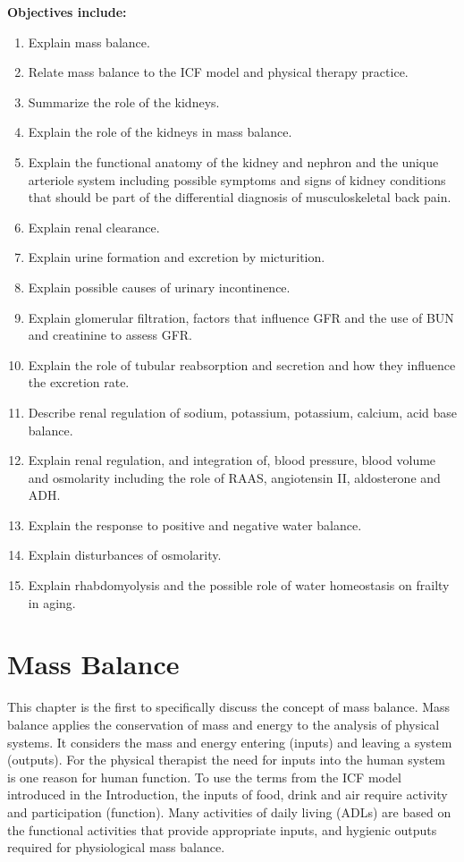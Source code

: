 \textbf{Objectives include:}
\begin{enumerate}
    \item Explain mass balance.
    \item Relate mass balance to the ICF model and physical therapy practice. 
    \item Summarize the role of the kidneys.
    \item Explain the role of the kidneys in mass balance.
    \item Explain the functional anatomy of the kidney and nephron and the unique arteriole system including possible symptoms and signs of kidney conditions that should be part of the differential diagnosis of musculoskeletal back pain.
    \item Explain renal clearance.
    \item Explain urine formation and excretion by micturition.
    \item Explain possible causes of urinary incontinence.
    \item Explain glomerular filtration, factors that influence GFR and the use of BUN and creatinine to assess GFR.
    \item Explain the role of tubular reabsorption and secretion and how they influence the excretion rate.
    \item Describe renal regulation of sodium, potassium, potassium, calcium, acid base balance.
    \item Explain renal regulation, and integration of, blood pressure, blood volume and osmolarity including the role of RAAS, angiotensin II, aldosterone and ADH.
    \item Explain the response to positive and negative water balance.
    \item Explain disturbances of osmolarity.
    \item Explain rhabdomyolysis and the possible role of water homeostasis on frailty in aging.
\end{enumerate}

\section{Mass Balance}

This chapter is the first to specifically discuss the concept of mass balance. Mass balance applies the conservation of mass and energy to the analysis of physical systems. It considers the mass and energy entering (inputs) and leaving a system (outputs). For the physical therapist the need for inputs into the human system is one reason for human function. To use the terms from the ICF model introduced in the Introduction, the inputs of food, drink and air require activity and participation (function). Many activities of daily living (ADLs) are based on the functional activities that provide appropriate inputs, and hygienic outputs required for physiological mass balance.


